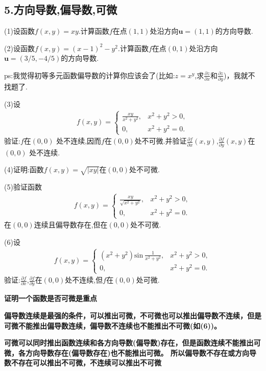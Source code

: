 \documentclass{ctexart}
\begin{document}
\subsection*{5.方向导数,偏导数,可微}
\noindent(1)设函数$f(x,y)=xy.$计算函数$f$在点$(1,1)$处沿方向$\mathbf{u}=(1,1)$的方向导数.

\noindent(2)设函数$f(x,y)=(x-1)^{2}-y^{2}.$计算函数$f$在点$(0,1)$处沿方向$\mathbf{u}=(3/5,-4/5)$的方向导数.

\noindent ps:我觉得初等多元函数偏导数的计算你应该会了(比如:$z=x^{y}$,求$\frac{\partial z}{\partial x}$和$\frac{\partial z}{\partial y}$)，我就不找题了.

\noindent (3)设
\begin{eqnarray}
f(x,y)=
\begin{cases}
\frac{xy}{x^{2}+y^{2}},&x^{2}+y^{2}>0,\\
0,&x^{2}+y^{2}=0.
\end{cases}
\end{eqnarray}
验证:$f$在$(0,0)$ 处不连续,因而$f$在$(0,0)$处不可微.并验证$\frac{\partial f}{\partial x}(x,y)$,$\frac{\partial f}{\partial y}(x,y)$在$(0,0)$ 处不连续.

\noindent (4)证明:函数$f(x,y)=\sqrt{|xy|}$在$(0,0)$处不可微.

\noindent (5)验证函数
\begin{eqnarray}
f(x,y)=
\begin{cases}
\frac{xy}{\sqrt{x^{2}+y^{2}}},&x^{2}+y^{2}>0,\\
0,&x^{2}+y^{2}=0.
\end{cases}
\end{eqnarray}
在$(0,0)$连续且偏导数存在,但在$(0,0)$处不可微.

\noindent (6)设
\begin{eqnarray}
f(x,y)=
\begin{cases}
(x^{2}+y^{2})\mathrm{sin}\ \frac{1}{x^{2}+y^{2}},&x^{2}+y^{2}>0,\\
0,&x^{2}+y^{2}=0.
\end{cases}
\end{eqnarray}
验证:$\frac{\partial f}{\partial x}$,$\frac{\partial f}{\partial y}$在$(0,0)$处不连续,但$f$在$(0,0)$处可微.
\newpage

\textbf{证明一个函数是否可微是重点}

\textbf{偏导数连续是最强的条件，可以推出可微，不可微也可以推出偏导数不连续，但是可微不能推出偏导数连续，偏导数不连续也不能推出不可微(如(6))。}

\textbf{可微可以同时推出函数连续和各方向导数(偏导数)存在，但是函数连续不能推出可微，各方向导数存在(偏导数存在)也不能推出可微。
所以偏导数不存在或方向导数不存在可以推出不可微，不连续可以推出不可微}
\end{document}
